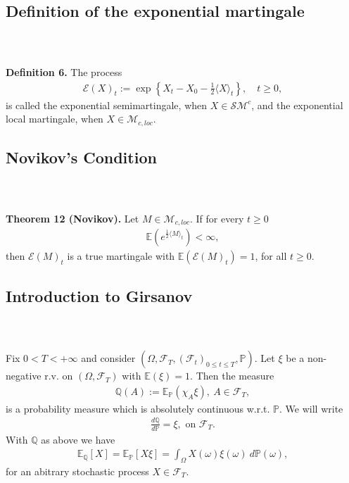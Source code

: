 \documentclass{beamer}
\numberwithin{equation}{section}
\newenvironment{frame2}{\begin{frame}\frametitle{{\normalsize \secname} \\ {\large \subsecname}}}{\end{frame}}
\begin{document}
\subsection{Definition of the exponential martingale}
\begin{frame2}
    \textbf{Definition 6.}
    The process
    \begin{align*}
        \mathcal{E}(X)_t:=\exp\left\{X_t-X_0-\frac{1}{2}\langle X \rangle_t\right\}, \quad t\geq 0,
    \end{align*}
    is called the exponential semimartingale, when $X\in\mathcal{S}\mathcal{M}^c$, and the exponential local martingale, when $X\in\mathcal{M}_{c,loc}$.
\end{frame2}

\subsection{Novikov's Condition}
\begin{frame2}
    \textbf{Theorem 12 (Novikov).}
    Let $M\in\mathcal{M}_{c, loc}$.
    If for every $t\geq 0$
    \begin{align*}
        \mathbb{E}(e^{\frac{1}{2}\langle M\rangle_t})<\infty,
    \end{align*}
    then $\mathcal{E}(M)_t$ is a true martingale with $\mathbb{E}(\mathcal{E}(M)_t)=1$, for all $t\geq 0$.
\end{frame2}

\subsection{Introduction to Girsanov}
\begin{frame2}
    Fix $0 < T < +\infty$ and consider $(\Omega, \mathscr{F}_T, (\mathscr{F}_t)_{0 \leq t \leq T}, \mathbb{P})$. Let $\xi$ be a non-negative r.v.\! on $(\Omega, \mathscr{F}_T)$ with $\mathbb{E}\left(\xi\right) = 1$. Then the measure
    \begin{align*}
        \mathbb{Q}(A) := \mathbb{E}_\mathbb{P}\left(\chi_A\xi\right), \ A \in \mathscr{F}_T,
    \end{align*}
    is a probability measure which is absolutely continuous w.r.t.\! $\mathbb{P}$.
    We will write
    \begin{align*}
        \frac{d\mathbb{Q}}{d\mathbb{P}} = \xi, \text{ on } \mathscr{F}_T.
    \end{align*}
    With $\mathbb{Q}$ as above we have
    \begin{align*}
        \mathbb{E}_\mathbb{Q}\left[X\right] = \mathbb{E}_\mathbb{P}\left[X\xi\right] = \int_\Omega X(\omega)\xi(\omega) \ d \mathbb{P}(\omega),
    \end{align*}
    for an abitrary stochastic process $X \in \mathscr{F}_T$.
\end{frame2}
\end{document}

